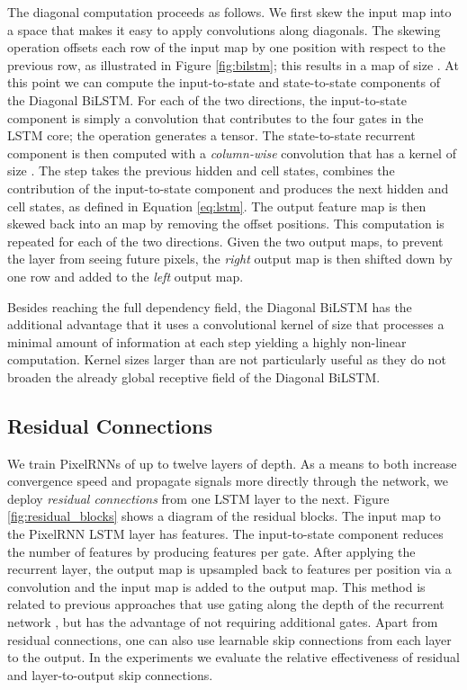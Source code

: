 \documentclass{article}
\begin{document}
The diagonal computation proceeds as follows. We first skew the input map into a space that makes it easy to apply convolutions along diagonals. The {skewing} operation offsets each row of the input map by one position with respect to the previous row, as illustrated in Figure \ref{fig:bilstm}; this results in a map of size . At this point we can compute the input-to-state and state-to-state components of the Diagonal BiLSTM. For each of the two directions, the input-to-state component is simply a  convolution  that contributes to the four gates in the LSTM core; the operation generates a  tensor. The state-to-state recurrent component is then computed with a \emph{column-wise} convolution  that has a kernel of size . The step takes the previous hidden and cell states, combines the contribution of the input-to-state component and produces the next hidden and cell states, as defined in Equation \ref{eq:lstm}. The output feature map is then skewed back into an  map by removing the offset positions. This computation is repeated for each of the two directions. Given the two output maps, to prevent the layer from seeing future pixels, the \emph{right} output map is then shifted down by one row and added to the \emph{left} output map.
 
Besides reaching the full dependency field, the Diagonal BiLSTM has the additional advantage that it uses a convolutional kernel of size  that processes a minimal amount of information at each step yielding a highly non-linear computation. Kernel sizes larger than  are not particularly useful as they do not broaden the already global receptive field of the Diagonal BiLSTM. 

\subsection{Residual Connections}
\label{sect:residual}

We train PixelRNNs of up to twelve layers of depth. As a means to both increase convergence speed and propagate signals more directly through the network, we deploy \emph{residual connections} \cite{DBLP:journals/corr/HeZRS15} from one LSTM layer to the next. Figure \ref{fig:residual_blocks} shows a diagram of the residual blocks. The input map to the PixelRNN LSTM layer has  features. The input-to-state component reduces the number of features by producing  features per gate. After applying the recurrent layer, the output map is upsampled back to  features per position via a  convolution and the input map is added to the output map. This method is related to previous approaches that use gating along the depth of the recurrent network \cite{DBLP:journals/corr/KalchbrennerDG15,zhang2016highway}, but has the advantage of not requiring additional gates. Apart from residual connections, one can also use learnable skip connections from each layer to the output. In the experiments we evaluate the relative effectiveness of residual and layer-to-output skip connections. 
	
\end{document}
